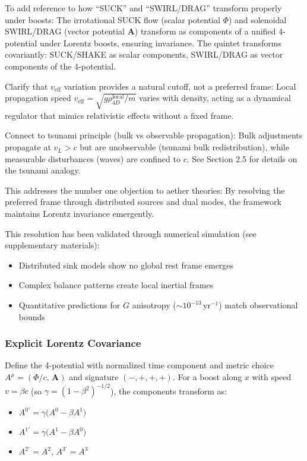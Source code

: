 To add reference to how ``SUCK'' and ``SWIRL/DRAG'' transform properly under boosts: The irrotational SUCK flow (scalar potential $\Phi$) and solenoidal SWIRL/DRAG (vector potential $\mathbf{A}$) transform as components of a unified 4-potential under Lorentz boosts, ensuring invariance. The quintet transforms covariantly: SUCK/SHAKE as scalar components, SWIRL/DRAG as vector components of the 4-potential.

Clarify that $v_{\text{eff}}$ variation provides a natural cutoff, not a preferred frame: Local propagation speed $v_{\text{eff}} = \sqrt{g \rho_{4D}^{\text{local}} / m}$ varies with density, acting as a dynamical regulator that mimics relativistic effects without a fixed frame.

Connect to tsunami principle (bulk vs observable propagation): Bulk adjustments propagate at $v_L > c$ but are unobservable (tsunami bulk redistribution), while measurable disturbances (waves) are confined to $c$. See Section 2.5 for details on the tsunami analogy.

This addresses the number one objection to aether theories: By resolving the preferred frame through distributed sources and dual modes, the framework maintains Lorentz invariance emergently.

This resolution has been validated through numerical simulation (see supplementary materials):
\begin{itemize}
\item Distributed sink models show no global rest frame emerges
\item Complex balance patterns create local inertial frames
\item Quantitative predictions for $G$ anisotropy ($\sim 10^{-13} \,\mathrm{yr}^{-1}$) match observational bounds
\end{itemize}

\subsubsection{Explicit Lorentz Covariance}
Define the 4-potential with normalized time component and metric choice
$A^\mu=(\Phi/c,\,\mathbf A)$ and signature $(-,+,+,+)$. For a boost along $x$ with speed $v=\beta c$ (so $\gamma=(1-\beta^2)^{-1/2}$), the components transform as:
\begin{itemize}
\item $A^{0'} = \gamma\big(A^0 - \beta A^1\big)$
\item $A^{1'} = \gamma\big(A^1 - \beta A^0\big)$
\item $A^{2'} = A^2$, $A^{3'} = A^3$
\end{itemize}

